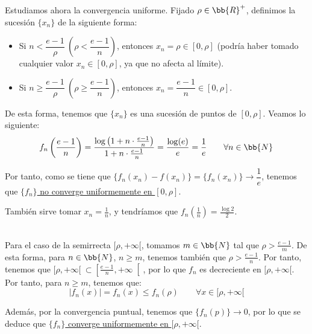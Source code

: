 \begin{ejercicio}
    Estudiamos ahora la convergencia uniforme. Fijado $\rho \in \bb{R}^+$, definimos la sucesión $\{x_n\}$ de la siguiente forma:
    \begin{itemize}
        \item Si $n < \dfrac{e-1}{\rho}~\left(\rho < \dfrac{e-1}{n}\right)$, entonces $x_n = \rho \in [0,\rho]$ (podría haber tomado cualquier valor $x_n\in [0,\rho]$, ya que no afecta al límite).
        \item Si $n \geq \dfrac{e-1}{\rho}~\left(\rho \geq \dfrac{e-1}{n}\right)$, entonces $x_n = \dfrac{e-1}{n}\in [0, \rho]$.
    \end{itemize}

    De esta forma, tenemos que $\{x_n\}$ es una sucesión de puntos de $[0,\rho]$. Veamos lo siguiente:
    \begin{equation*}
        f_n\left(\frac{e-1}{n}\right) = \frac{\log\left(1+n\cdot \frac{e-1}{n}\right)}{1+n\cdot \frac{e-1}{n}} =
        \frac{\log(e)}{e} = \frac{1}{e} \qquad \forall n\in \bb{N}
    \end{equation*}

    Por tanto, como se tiene que $\{f_n(x_n)-f(x_n)\}=\{f_n(x_n)\}\to \dfrac{1}{e}$, tenemos que \ul{$\{f_n\}$ no converge uniformemente en $[0,\rho]$}.
    \begin{observacion}
        También sirve tomar $x_n = \frac{1}{n}$, y tendríamos que $f_n\left(\frac{1}{n}\right) = \frac{\log 2}{2}$.
    \end{observacion}~\\

    Para el caso de la semirrecta $[\rho,+\infty[$, tomamos $m\in \bb{N}$ tal que $\rho > \frac{e-1}{m}$. De esta forma,
    para $n\in \bb{N}$, $n\geq m$, tenemos también que $\rho > \frac{e-1}{n}$. Por tanto,
    tenemos que $[\rho ,+\infty[~\subset \left[\frac{e-1}{n},+\infty\right[$,
    por lo que $f_n$ es decreciente en $[\rho,+\infty[$. Por tanto, para $n\geq m$, tenemos que:
    \begin{equation*}
        |f_n(x)| = f_n(x) \leq f_n(\rho) \qquad \forall x\in [\rho,+\infty[
    \end{equation*}

    Además, por la convergencia puntual, tenemos que $\{f_n(p)\}\to 0$, por lo que se deduce que \ul{$\{f_n\}$ converge uniformemente en $[\rho,+\infty[$}.
\end{ejercicio}



